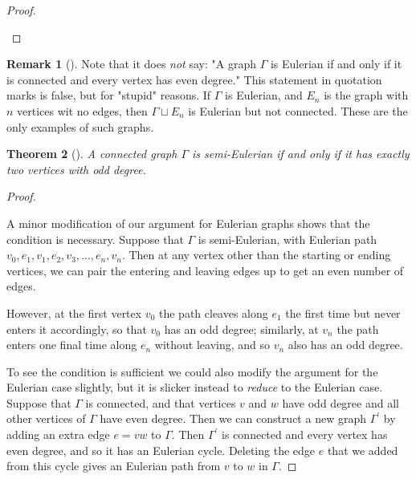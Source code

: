 \documentclass[10pt,]{book}
\theoremstyle{plain}
\newtheorem{theorem}{Theorem}[section]
\theoremstyle{definition}
\theoremstyle{definition}
\newtheorem{remark}[theorem]{Remark}
\theoremstyle{definition}
\theoremstyle{definition}
\numberwithin{equation}{section}
\begin{document}
\begin{proof}\hypertarget{proof-4}{}
\end{proof}
\begin{remark}[]\label{remark-1}
\hypertarget{p-129}{}%
Note that it does \emph{not} say: "A graph \(\Gamma\) is Eulerian if and only if it is connected and every vertex has even degree." This statement in quotation marks is false, but for "stupid" reasons.  If \(\Gamma\) is Eulerian, and \(E_n\) is the graph with \(n\) vertices wit no edges, then \(\Gamma\sqcup E_n\) is Eulerian but not connected.  These are the only examples of such graphs.%
\end{remark}
\begin{theorem}[{}]\label{theorem-3}
\hypertarget{p-130}{}%
A connected graph \(\Gamma\) is semi-Eulerian if and only if it has exactly two vertices with odd degree.%
\end{theorem}
\begin{proof}\hypertarget{proof-5}{}
\hypertarget{p-131}{}%
A minor modification of our argument for Eulerian graphs shows that the condition is necessary.  Suppose that \(\Gamma\) is semi-Eulerian, with Eulerian path \(v_0, e_1, v_1,e_2,v_3,\dots,e_n,v_n\).  Then at any vertex other than the starting or ending vertices, we can pair the entering and leaving edges up to get an even number of edges.%
\par
\hypertarget{p-132}{}%
However, at the first vertex \(v_0\) the path cleaves along \(e_1\) the first time but never enters it accordingly, so that \(v_0\) has an odd degree; similarly, at \(v_n\) the path enters one final time along \(e_n\) without leaving, and so \(v_n\) also has an odd degree.%
\par
\hypertarget{p-133}{}%
To see the condition is sufficient we could also modify the argument for the Eulerian case slightly, but it is slicker instead to \emph{reduce} to the Eulerian case.  Suppose that \(\Gamma\) is connected, and that vertices \(v\) and \(w\) have odd degree and all other vertices of \(\Gamma\) have even degree.  Then we can construct a new graph \(\Gamma^\prime\) by adding an extra edge \(e=vw\) to \(\Gamma\).  Then \(\Gamma^\prime\) is connected and every vertex has even degree, and so it has an Eulerian cycle.  Deleting the edge \(e\) that we added from this cycle gives an Eulerian path from \(v\) to \(w\) in \(\Gamma\).%
\end{proof}
\typeout{************************************************}
\typeout{************************************************}
\end{document}
